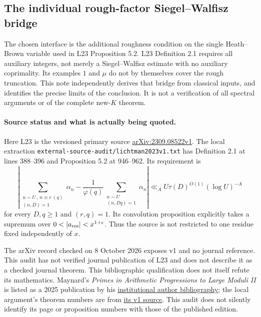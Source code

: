 \subsection{The individual rough-factor Siegel--Walfisz bridge}
\label{sec:focused-rough-sw-product-interface-audit}

The chosen interface is the additional roughness condition on the single
Heath--Brown variable used in L23 Proposition 5.2. L23 Definition 2.1
requires all auxiliary integers, not merely a Siegel--Walfisz estimate
with no auxiliary coprimality. Its examples $1$ and $\mu$ do not by
themselves cover the rough truncation. This note independently derives
that bridge from classical inputs, and identifies the precise limits of
the conclusion. It is not a verification of all spectral arguments or
of the complete new-$K$ theorem.

\paragraph{Source status and what is actually being quoted.}
Here L23 is the versioned primary source
\href{https://arxiv.org/abs/2309.08522v1}{arXiv:2309.08522v1}.
The local extraction \texttt{external-source-audit/lichtman2023v1.txt}
has Definition 2.1 at lines 388--396 and Proposition 5.2 at
946--962. Its requirement is
\[
 \left|\sum_{\substack{n\sim U\,,\ n\equiv r\ (q)\\(n,D)=1}}
 \alpha_n-\frac1{\varphi(q)}\sum_{\substack{n\sim U\\(n,Dq)=1}}
 \alpha_n\right|
 \ll_A U\tau(D)^{O(1)}(\log U)^{-A}
\]
for every $D,q\ge1$ and $(r,q)=1$. Its convolution proposition
explicitly takes a supremum over $0<|a_{\rm res}|<x^{1+\epsilon}$.
Thus the source is not restricted to one residue fixed independently
of $x$.

The arXiv record checked on 8 October 2026 exposes v1 and no journal
reference. This audit has not verified journal publication of L23 and
does not describe it as a checked journal theorem. This bibliographic
qualification does not itself refute its mathematics. Maynard's
\emph{Primes in Arithmetic Progressions to Large Moduli II} is listed as
a 2025 publication by his
\href{https://www.maths.ox.ac.uk/research/faculty-books/authors-k-o/james-maynard}
{institutional author bibliography}; the local argument's theorem
numbers are from \href{https://arxiv.org/abs/2006.07088v1}{its v1 source}.
This audit does not silently identify its page or proposition numbers
with those of the published edition.

